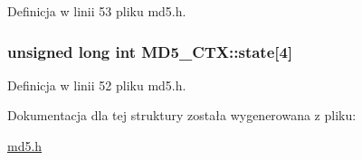 Definicja w linii 53 pliku md5.h.\hypertarget{a00003_2f697997f51de65d08227fdf1d5c44b8}{
\subsubsection[{state}]{\setlength{\rightskip}{0pt plus 5cm}unsigned long int {\bf MD5\_\-CTX::state}\mbox{[}4\mbox{]}}}
\label{d1/d7c/a00003_2f697997f51de65d08227fdf1d5c44b8}




Definicja w linii 52 pliku md5.h.

Dokumentacja dla tej struktury została wygenerowana z pliku:\begin{CompactItemize}
\item 
\hyperlink{a00011}{md5.h}\end{CompactItemize}
